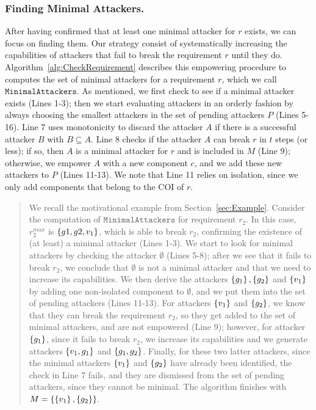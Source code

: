 {\subsubsection{Finding Minimal Attackers.} 
After having confirmed that at least one minimal attacker for $r$ exists, we can focus on finding them. Our strategy consist of systematically increasing the capabilities of attackers that fail to break the requirement $r$ until they do. Algorithm~\ref{alg:CheckRequirement} describes this empowering procedure to computes the set of minimal attackers for a requirement $r$, which we call $\mathtt{MinimalAttackers}$. As mentioned, we first check to see if a minimal attacker exists (Lines 1-3); then we start evaluating attackers in an orderly fashion by always choosing the smallest attackers in the set of pending attackers $P$ (Lines 5-16). Line 7 uses monotonicity to discard the attacker $A$ if there is a successful attacker $B$ with $B\subseteq A$. Line 8 checks if the attacker $A$ can break $r$ in $t$ steps (or less); if so, then $A$ is a minimal attacker for $r$ and is included in $M$ (Line 9); otherwise, we empower $A$ with a new component $c$, and we add these new attackers to $P$ (Lines 11-13). We note that Line 11 relies on isolation, since we only add components that belong to the COI of $r$.

\begin{quote}
We recall the motivational example from Section~\ref{sec:Example}. Consider the computation of $\mathtt{MinimalAttackers}$ for requirement $r_2$. In this case, $r_2^{max}$ is $\left\{g1,g2,v_1\right\}$, which is able to break $r_2$, confirming the existence of (at least) a minimal attacker (Lines 1-3). We start to look for minimal attackers by checking the attacker $\emptyset$ (Lines 5-8); after we see that it fails to break $r_2$, we conclude that $\emptyset$ is not a minimal attacker and that we need to increase its capabilities. We then derive the attackers $\left\{g_1\right\}, \left\{g_2\right\}$ and $\left\{v_1\right\}$ by adding one non-isolated component to $\emptyset$, and we put them into the set of pending attackers (Lines 11-13). For attackers $\left\{v_1\right\}$ and $\left\{g_2\right\}$, we know that they can break the requirement $r_2$, so they get added to the set of minimal attackers, and are not empowered (Line 9); however, for attacker $\left\{g_1\right\}$, since it fails to break $r_2$, we increase its capabilities and we generate attackers $\left\{v_1, g_1\right\}$ and $\left\{g_1, g_2\right\}$. Finally, for these two latter attackers, since the minimal attackers $\left\{v_1\right\}$ and $\left\{g_2\right\}$ have already been identified, the check in Line 7 fails, and they are dismissed from the set of pending attackers, since they cannot be minimal. The algorithm finishes with $M=\left\{\left\{v_1\right\}, \left\{g_2\right\}\right\}$.
\end{quote}


}
